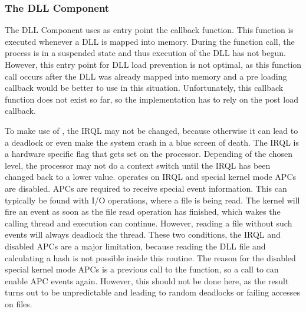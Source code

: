 \subsubsection{The DLL Component}
The \gls{DLL} Component uses as entry point the  callback function. This function is executed whenever a \gls{DLL} is mapped into memory. During the function call, the process is in a suspended state and thus execution of the \gls{DLL} has not begun. However, this entry point for \gls{DLL} load prevention is not optimal, as this function call occurs after the \gls{DLL} was already mapped into memory and a pre loading callback would be better to use in this situation. Unfortunately, this callback function does not exist so far, so the implementation has to rely on the post load callback.

\medskip

To make use of , the \gls{IRQL} may not be changed, because otherwise it can lead to a deadlock or even make the system crash in a blue screen of death. The \gls{IRQL} is a hardware specific flag that gets set on the processor. Depending of the chosen level, the processor may not do a context switch until the \gls{IRQL} has been changed back to a lower value.  operates on \gls{IRQL}  and special kernel mode \glspl{APC} are disabled. \glspl{APC} are required to receive special event information. This can typically be found with I/O operations, where a file is being read. The kernel will fire an event as soon as the file read operation has finished, which wakes the calling thread and execution can continue. However, reading a file without such events will always deadlock the thread. These two conditions, the \gls{IRQL} and disabled \glspl{APC} are a major limitation, because reading the \gls{DLL} file and calculating a hash is not possible inside this routine. The reason for the disabled special kernel mode \glspl{APC} is a previous call to the  function, so a call to  can enable \gls{APC} events again. However, this should not be done here, as the result turns out to be unpredictable and leading to random deadlocks or failing accesses on files.

\medskip

